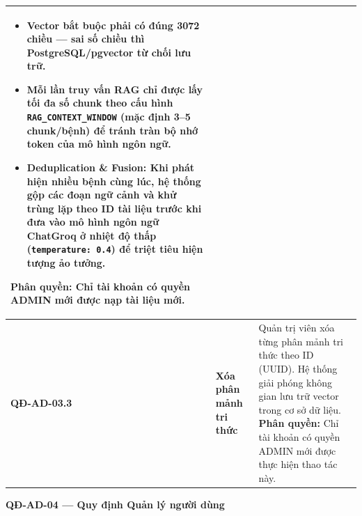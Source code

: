 \documentclass[12pt,a4paper]{article}
\begin{document}
\begin{longtable}{|
        >{\raggedright\arraybackslash}p{2.2cm}|
        >{\raggedright\arraybackslash}p{2.8cm}|
        >{\raggedright\arraybackslash}p{9.8cm}|}
\begin{itemize}[leftmargin=*,topsep=2pt,itemsep=1pt]
        \item Vector bắt buộc phải có đúng \textbf{3072 chiều} --- sai số chiều thì PostgreSQL/pgvector từ chối lưu trữ.
        \item Mỗi lần truy vấn RAG chỉ được lấy tối đa số chunk theo cấu hình \texttt{RAG\_CONTEXT\_WINDOW} (mặc định 3--5 chunk/bệnh) để tránh tràn bộ nhớ token của mô hình ngôn ngữ.
        \item \textbf{Deduplication \& Fusion:} Khi phát hiện nhiều bệnh cùng lúc, hệ thống gộp các đoạn ngữ cảnh và khử trùng lặp theo ID tài liệu trước khi đưa vào mô hình ngôn ngữ ChatGroq ở nhiệt độ thấp (\texttt{temperature: 0.4}) để triệt tiêu hiện tượng ảo tưởng.
    \end{itemize}
    \textbf{Phân quyền:} Chỉ tài khoản có quyền ADMIN mới được nạp tài liệu mới. \\
    \hline
    \textbf{QĐ-AD-03.3} & \textbf{Xóa phân mảnh tri thức} &
    Quản trị viên xóa từng phân mảnh tri thức theo ID (UUID). Hệ thống giải phóng không gian lưu trữ vector trong cơ sở dữ liệu. \newline
    \textbf{Phân quyền:} Chỉ tài khoản có quyền ADMIN mới được thực hiện thao tác này. \\
    \hline
\end{longtable}

\vspace{0.3cm}
\noindent\textbf{QĐ-AD-04 --- Quy định Quản lý người dùng}
\end{document}
